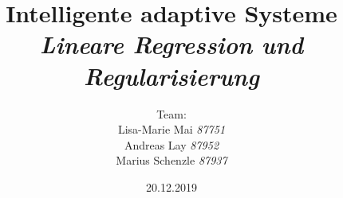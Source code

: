 

\title{\textbf{Intelligente adaptive Systeme}\\\textit{Lineare Regression und Regularisierung}}
\author{Team:\\Lisa-Marie Mai \textit{87751}\\Andreas Lay \textit{87952}\\Marius Schenzle \textit{87937} \vspace{10px}}
\date{20.12.2019}


\doublespacing
{}
\maketitle
\newpage
\tableofcontents
\newpage
\singlespacing
{}


\newpage


\newpage




